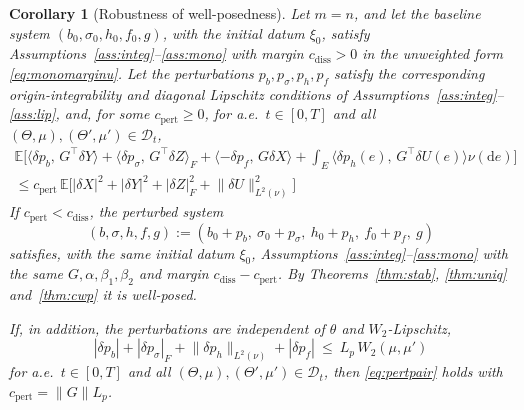 \documentclass[preprint,12pt]{elsarticle}
\newcommand{\E}{\mathbb{E}}
\newcommand{\diff}{\mathrm{d}}
\newcommand{\inner}[2]{\langle #1,\,#2\rangle}
\newcommand{\Lnu}{L^2(\nu)}
\newcommand{\Gstar}{G^{\!\top}}
\newcommand{\Lnorm}[1]{\lVert #1\rVert_{\Lnu}}
\numberwithin{equation}{section}
\theoremstyle{plain}
\newtheorem{corollary}[theorem]{Corollary}
\theoremstyle{definition}
\theoremstyle{\PaperRemarkStyle}
\begin{document}
\begin{corollary}[Robustness of well-posedness]\label{cor:robust}
Let $m=n$, and let the baseline system $(b_0,\sigma_0,h_0,f_0,g)$, with the initial
datum $\xi_0$, satisfy Assumptions~\ref{ass:integ}--\ref{ass:mono} with margin
$c_{\mathrm{diss}}>0$ in the unweighted form \eqref{eq:monomarginu}. Let the perturbations
$p_b,p_\sigma,p_h,p_f$ satisfy the corresponding origin-integrability and diagonal
Lipschitz conditions of Assumptions~\ref{ass:integ}--\ref{ass:lip}, and, for some
$c_{\mathrm{pert}}\ge0$, for a.e.\ $t\in[0,T]$ and all
$(\Theta,\mu),(\Theta',\mu')\in\mathcal D_t$,
\begin{multline}\label{eq:pertpair}
\E\!\Big[\inner{\delta p_b}{\Gstar\delta Y}+\inner{\delta p_\sigma}{\Gstar\delta Z}_F
+\inner{-\delta p_f}{G\delta X}+\!\int_E\!\inner{\delta p_h(e)}{\Gstar\delta U(e)}\nu(\diff e)\Big]\\
\le c_{\mathrm{pert}}\,\E\big[|\delta X|^2+|\delta Y|^2+|\delta Z|_F^2+\Lnorm{\delta U}^2\big]
\end{multline}
If
$c_{\mathrm{pert}}<c_{\mathrm{diss}}$, the perturbed system
\[
(b,\sigma,h,f,g):=(b_0+p_b,\ \sigma_0+p_\sigma,\ h_0+p_h,\ f_0+p_f,\ g)
\]
satisfies, with the same initial datum $\xi_0$, Assumptions~\ref{ass:integ}--\ref{ass:mono}
with the same $G,\alpha,\beta_1,\beta_2$ and margin $c_{\mathrm{diss}}-c_{\mathrm{pert}}$. By
Theorems~\ref{thm:stab}, \ref{thm:uniq} and~\ref{thm:cwp} it is well-posed.

If, in addition, the perturbations are independent of $\theta$ and $W_2$-Lipschitz,
\begin{equation}\label{eq:pertlip}
|\delta p_b|+|\delta p_\sigma|_F+\Lnorm{\delta p_h}+|\delta p_f|\ \le\ L_p\,W_2(\mu,\mu')
\end{equation}
for a.e.\ $t\in[0,T]$ and all $(\Theta,\mu),(\Theta',\mu')\in\mathcal D_t$, then
\eqref{eq:pertpair} holds with
$c_{\mathrm{pert}}=\|G\|L_p$.
\end{corollary}
\end{document}
